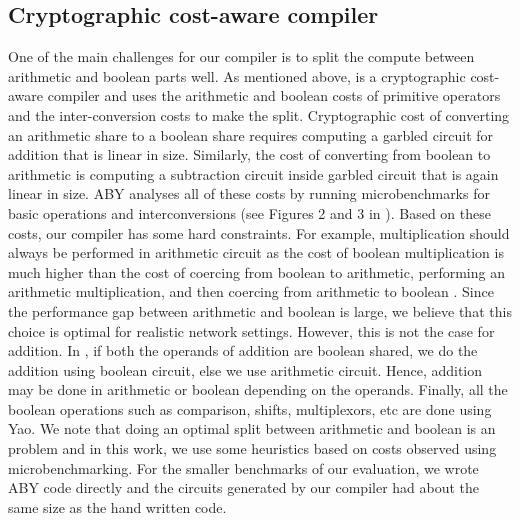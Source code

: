 \subsection{Cryptographic cost-aware compiler}
\label{sec:ccc}
One of the main challenges for our compiler is to split the compute between arithmetic and boolean parts well. 
As mentioned above, \tool is a cryptographic cost-aware compiler and uses the arithmetic and boolean costs of primitive operators and the inter-conversion costs to make the split. Cryptographic cost of converting an arithmetic share to a boolean share requires computing a garbled circuit for addition that is linear in size. Similarly, the cost of converting from boolean to arithmetic is computing a subtraction circuit inside garbled circuit that is again linear in size. ABY analyses all of these costs by running microbenchmarks for basic operations and interconversions (see Figures 2 and 3 in \cite{aby}). Based on these costs, our compiler has some hard constraints. For example, multiplication should always be performed in arithmetic circuit as the cost of boolean multiplication is much higher than  the cost of coercing from boolean to arithmetic, performing an arithmetic multiplication, and then coercing from arithmetic to boolean . Since the performance gap between arithmetic and boolean is large, we believe that this choice is optimal for realistic network settings.
However, this is not the case for addition. In \tool, if both the operands of addition are boolean shared, we do the addition using boolean circuit, else we use arithmetic circuit. Hence, addition may be done in arithmetic or boolean depending on the operands. 
Finally, all the boolean operations such as comparison, shifts, multiplexors, etc are done using Yao.
We note that doing an optimal split between arithmetic and boolean is an  problem and in this work, we use some heuristics based on costs observed using microbenchmarking. 
For the smaller benchmarks of our evaluation, we wrote ABY code directly and the circuits
generated by our compiler had about the same size as the  hand written code. 





